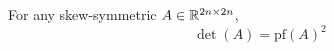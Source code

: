 \begin{theorem}[Cayley 1849]
For any skew-symmetric \(A\in\mathbb{R}^{2n\times 2n}\),
\[ \det(A)=\mathrm{pf}(A)^2 \]
\end{theorem}
